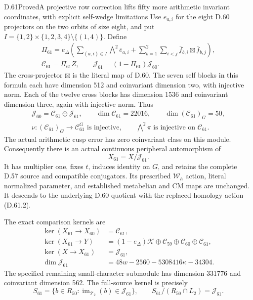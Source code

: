 \begin{statement}{D.61}{Proved}{A projective row correction lifts fifty more arithmetic invariant coordinates, with explicit self-wedge limitations}
Use \(e_{a,i}\) for the eight D.60 projectors
on the two orbits of size eight, and put
\(I=\{1,2\}\times\{1,2,3,4\}\setminus\{(1,4)\}\).
Define
\[
 \begin{aligned}
 \Pi_{61}=e_\Delta\left(
   \sum_{(a,i)\in I}\bigwedge\nolimits^2\bar e_{a,i}
    +\sum_{b=1}^{2}\sum_{i<j}
             \bar f_{b,i}\boxtimes\bar f_{b,j}\right),\\
 \mathcal C_{61}=\Pi_{61}Z,\qquad
 \mathcal J_{61}=(1-\Pi_{61})\mathcal J_{60}.
 \end{aligned}
 \tag{D.61.4}
\]
The cross-projector \(\boxtimes\) is the literal
map of D.60. The seven self blocks in this
formula each have dimension 512 and coinvariant
dimension two, with injective norm. Each of the
twelve cross blocks has dimension 1536 and
coinvariant dimension three, again with injective
norm. Thus
\[
 \begin{gathered}
 \mathcal J_{60}=\mathcal C_{61}\oplus\mathcal J_{61},\qquad
 \dim\mathcal C_{61}=22016,\qquad
 \dim(\mathcal C_{61})_G=50,\\
 \nu:(\mathcal C_{61})_G\longrightarrow\mathcal C_{61}^{G}
       \text{ is injective},\qquad
 \bigwedge^2\pi\text{ is injective on }\mathcal C_{61}.
 \end{gathered}
 \tag{D.61.5}
\]
The actual arithmetic cusp error has zero
coinvariant class on this module. Consequently
there is an actual continuous peripheral
automorphism of
\[
                         X_{61}=X/\mathcal J_{61}.
 \tag{D.61.6}
\]
It has multiplier one, fixes \(t\), induces
identity on \(G\), and retains the complete
D.57 source and compatible conjugators.
Its prescribed \(\mathcal W_h\) action,
literal normalized parameter, and established
metabelian and CM maps are unchanged.
It descends to the underlying D.60 quotient
with the replaced homology action (D.61.2).

The exact comparison kernels are
\[
 \begin{aligned}
 \ker(X_{61}\to X_{60})&=\mathcal C_{61},\\
 \ker(X_{61}\to Y)&=(1-e_\Delta)\mathcal K
       \oplus\mathcal C_{59}\oplus\mathcal C_{60}
       \oplus\mathcal C_{61},\\
 \ker(X\to X_{61})&=\mathcal J_{61},\\
 \dim\mathcal J_{61}&=48w-2560-5308416\kappa-34304.
 \end{aligned}
 \tag{D.61.7}
\]
The specified remaining small-character submodule
has dimension 331776 and coinvariant dimension
562. The full-source kernel is precisely
\[
 S_{61}=\{b\in R_{50}:
          \operatorname{im}_{\mathcal T_2}(b)\in\mathcal J_{61}\},
 \qquad S_{61}/(R_{50}\cap L_2)=\mathcal J_{61}.
 \tag{D.61.8}
\]


\end{statement}
